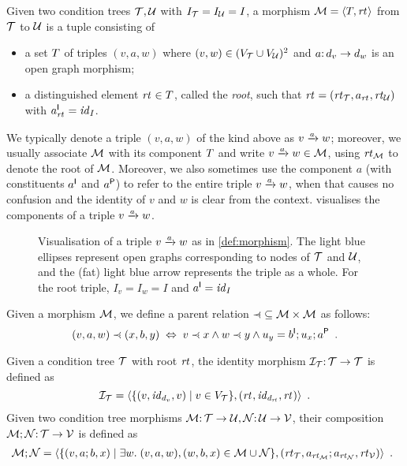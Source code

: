 \begin{definition}[morphism]\label{def:morphism}
Given two condition trees $\cT,\cU$ with $I_\cT=I_\cU=I$, a morphism $\cM=\tupof{\tp,\rt{}}$ from $\cT$ to $\cU$ is a tuple consisting of
\begin{itemize}
\item a set $\tp$ of triples $(v,a,w)$ where $(v,w)\in (V_\cT\cup V_\cU)^2$ and $a\of d_v\to d_w$ is an open graph morphism;
\item a distinguished element $\rt{}\in\tp$, called the \emph{root}, such that $\rt{}=(\rt\cT,a_{\rt{}},\rt\cU)$ with $a_{\rt{}}\I=\id_I$.
\end{itemize}
\end{definition}
%
We typically denote a triple $(v,a,w)$ of the kind above as $\trip vaw$; moreover, we usually associate $\cM$ with its component $\tp$ and write $\trip vaw\in\cM$, using $\rt\cM$ to denote the root of $\cM$. Moreover, we also sometimes use the component $a$ (with constituents $a\I$ and $a\P$) to refer to the entire triple $\trip vaw$, when that causes no confusion and the identity of $v$ and $w$ is clear from the context.  visualises the components of a triple $\trip vaw$.

\begin{figure}
\centering

\caption{Visualisation of a triple $\trip vaw$ as in \cref{def:morphism}. The light blue ellipses represent open graphs corresponding to nodes of $\cT$ and $\cU$, and the (fat) light blue arrow represents the triple as a whole. For the root triple, $I_v=I_w=I$ and $a\I=\id_I$}
\label{fig:triple}
\end{figure}

\noindent Given a morphism $\cM$, we define a parent relation ${\parentof}\subseteq \cM\times \cM$ as follows:
\[ (v,a,w)\parentof (x,b,y) \;\Leftrightarrow\; v\parentof x\wedge w\parentof y \wedge u_y=b\I;u_x;a\P \enspace. \]

\medskip\noindent
Given a condition tree $\cT$ with root $\rt{}$, the identity morphism $\cI_\cT\of \cT\to\cT$ is defined as
\[ \cI_\cT = \tupof{\gensetof{(v,\id_{d_v},v)}{v\in V_\cT},(\rt{},\id_{d_{\rt{}}},\rt{})} \enspace. \]
Given two condition tree morphisms $\cM\of \cT\to \cU,\cN\of \cU\to \cV$, their composition $\cM;\cN\of \cT\to \cV$ is defined as
\[ \cM;\cN =
\begin{array}[t]{@{}l}
	\tupof{\setof{(v,a;b,x) \mid \exists w\st (v,a,w), (w,b,x)\in \cM\cup \cN},(\rt\cT,a_{\rt\cM};a_{\rt\cN},\rt\cV)} \enspace.
\end{array}
\]
